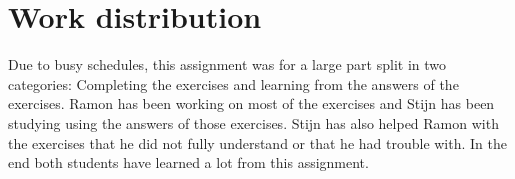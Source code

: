 \documentclass[twoside, a4paper, fleqn, reqno]{article}
\begin{document}
\section*{Work distribution}
Due to busy schedules, this assignment was for a large part split in two categories:
Completing the exercises and learning from the answers of the exercises.
Ramon has been working on most of the exercises and Stijn has been studying using the answers of those exercises.
Stijn has also helped Ramon with the exercises that he did not fully understand or that he had trouble with.
In the end both students have learned a lot from this assignment.
\end{document}
